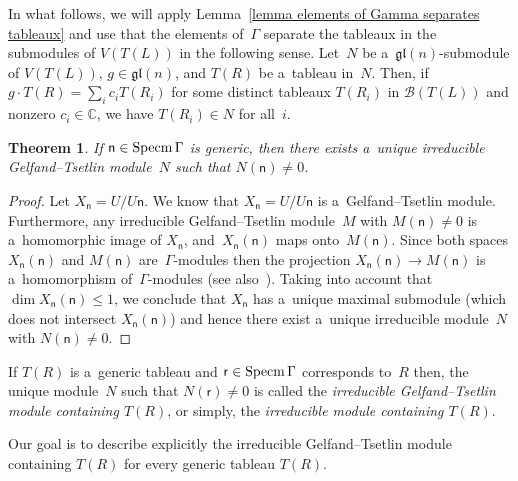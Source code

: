 \documentclass[11pt]{article}
\numberwithin{equation}{section}
\newtheorem{Theorem}{Theorem}[section]
\begin{document}
\begin{Remark}
\label{elements of Gamma separates tableaux}
In what follows, we will apply Lemma~\ref{lemma elements of Gamma separates tableaux} and use that the elements
of~$\Gamma$ separate the tableaux in the submodules of $V(T(L))$ in the following sense.
Let~$N$ be a~$\mathfrak{gl}(n)$-submodule of $V(T(L))$, $g \in \mathfrak{gl}(n)$, and $T(R)$ be a~tableau in~$N$.
Then, if $g \cdot T(R) = \sum\limits_i c_i T(R_i)$ for some distinct tableaux $T(R_i)$ in ${\mathcal B}(T(L))$ and
nonzero $c_i \in {\mathbb C}$, we have $T(R_i) \in N$ for all~$i$.
\end{Remark}

\begin{Theorem}
\label{uniqueness in generic case}
If $\mathsf n\in\operatorname{Specm}\Gamma$ is generic, then there exists a~unique irreducible Gelfand--Tsetlin module~$N$ such that
$N(\mathsf n)\neq 0$.
\end{Theorem}
\begin{proof}
Let $X_{\mathsf n}=U/U \mathsf n$.
We know that $X_{\mathsf n}=U/U \mathsf n$ is a~Gelfand--Tsetlin module.
Furthermore, any irreducible Gelfand--Tsetlin module~$M$ with $M(\mathsf n)\neq 0$ is a~homomorphic image of $X_{\mathsf
n}$, and~$X_{\mathsf n}(\mathsf n)$ maps onto~$M(\mathsf n)$.
Since both spaces $X_{\mathsf n}(\mathsf n)$ and $M(\mathsf n)$ are~$\Gamma$-modules then the projection $X_{\mathsf
n}(\mathsf n) \to M(\mathsf n)$ is a~homomorphism of~$\Gamma$-modules (see also~\cite[Corollary~5.3]{FO2}).
Taking into account that $\dim X_{\mathsf n}(\mathsf n) \leq 1$, we conclude that $X_{\mathsf n}$ has a~unique maximal
submodule (which does not intersect $X_{\mathsf n}(\mathsf n)$) and hence there exist a~unique irreducible module~$N$
with $N(\mathsf n)\neq 0$.
\end{proof}

\begin{Definition}
\label{def-cont}
If $T(R)$ is a~generic tableau and $\mathsf r\in\operatorname{Specm}\Gamma$ corresponds to~$R$ then, the unique module~$N$ such that
$N(\mathsf r) \neq 0$ is called the \emph{irreducible Gelfand--Tsetlin module containing $T(R)$}, or simply, the
\emph{irreducible module containing $T(R)$}.
\end{Definition}

Our goal is to describe explicitly the irreducible Gelfand--Tsetlin module containing $T(R)$ for every generic tableau $T(R)$.
\setcounter{section}{5}
\setcounter{subsection}{0}
\setcounter{subsubsection}{0}
\setcounter{Theorem}{8}
\setcounter{equation}{0}
\end{document}
